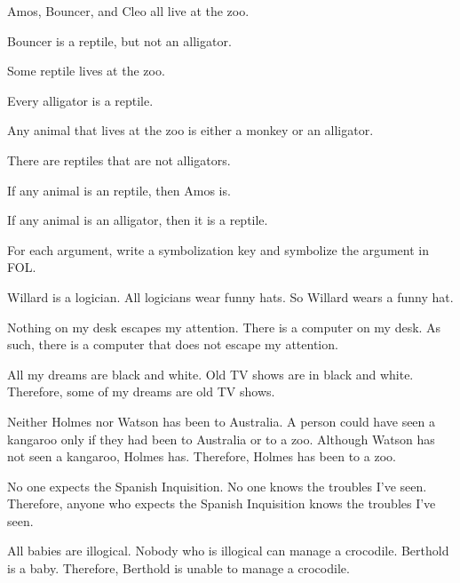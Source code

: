 \begin{compactlist}
\item Amos, Bouncer, and Cleo all live at the zoo.
\item Bouncer is a reptile, but not an alligator.
\item Some reptile lives at the zoo.
\item Every alligator is a reptile.
\item Any animal that lives at the zoo is either a monkey or an alligator.
\item There are reptiles that are not alligators.
\item If any animal is an reptile, then Amos is.
\item If any animal is an alligator, then it is a reptile.
\end{compactlist}

\problempart
\label{pr.FOLarguments}
For each argument, write a symbolization key and symbolize the argument in FOL.
\begin{compactlist}
\item Willard is a logician. All logicians wear funny hats. So Willard wears a funny hat.
\item Nothing on my desk escapes my attention. There is a computer on my desk. As such, there is a computer that does not escape my attention.
\item All my dreams are black and white. Old TV shows are in black and white. Therefore, some of my dreams are old TV shows.
\item Neither Holmes nor Watson has been to Australia. A person could have seen a kangaroo only if they had been to Australia or to a zoo. Although Watson has not seen a kangaroo, Holmes has. Therefore, Holmes has been to a zoo.
\item No one expects the Spanish Inquisition. No one knows the troubles I've seen. Therefore, anyone who expects the Spanish Inquisition knows the troubles I've seen.
\item All babies are illogical. Nobody who is illogical can manage a crocodile. Berthold is a baby. Therefore, Berthold is unable to manage a crocodile.
\end{compactlist}

